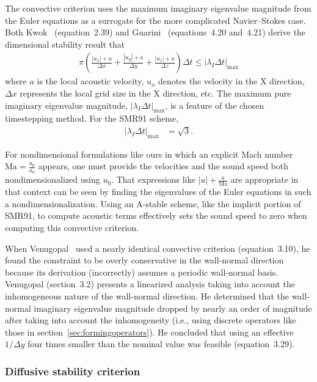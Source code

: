 \documentclass[letterpaper,11pt,nointlimits,reqno,draft]{amsart}
\begin{document}
The convective criterion uses the maximum imaginary eigenvalue magnitude from
the Euler equations as a surrogate for the more complicated Navier--Stokes
case.  Both Kwok~\cite{Kwok2002} (equation~2.39) and Guarini~\cite{Guarini1998}
(equations~4.20 and~4.21) derive the dimensional stability result that
\begin{align}\label{eq:convectivestability}
  \pi\left(
      \frac{\left|u_{x}\right| + a}{\Delta{}x}
    + \frac{\left|u_{y}\right| + a}{\Delta{}y}
    + \frac{\left|u_{z}\right| + a}{\Delta{}z}
  \right) \Delta{}t \leq \left|\lambda_{I}\Delta{}t\right|_{\mbox{max}}
\end{align}
where $a$ is the local acoustic velocity, $u_{x}$ denotes the velocity in the X
direction, $\Delta{}x$ represents the local grid size in the X direction, etc.
The maximum pure imaginary eigenvalue magnitude,
$\left|\lambda_{I}\Delta{}t\right|_{\mbox{max}}$, is a feature of the chosen
timestepping method.  For the SMR91 scheme,
\begin{align}
  \left|\lambda_{I}\Delta{}t\right|_{\mbox{max}} &= \sqrt{3}.
\end{align}

For nondimensional formulations like ours in which an explicit Mach number
$\mbox{Ma}=\frac{u_0}{a_0}$ appears, one must provide the velocities and the
sound speed both nondimensionalized using $u_0$.  That expressions like
$\left|u\right| + \frac{a}{\mbox{Ma}}$ are appropriate in that context can be
seen by finding the eigenvalues of the Euler equations in such a
nondimensionalization.  Using an A-stable scheme, like the implicit portion of
SMR91, to compute acoustic terms effectively sets the sound speed to zero when
computing this convective criterion.

When Venugopal~\cite{Venugopal2003} used a nearly identical convective
criterion (equation~3.10), he found the constraint to be overly conservative in
the wall-normal direction because its derivation (incorrectly) assumes a
periodic wall-normal basis.  Venugopal (section~3.2) presents a linearized
analysis taking into account the inhomogeneous nature of the wall-normal
direction.  He determined that the wall-normal imaginary eigenvalue magnitude
dropped by nearly an order of magnitude after taking into account the
inhomogeneity (i.e., using discrete operators like those in
section~\ref{sec:formingoperators}).  He concluded that using an effective
$1/\Delta{}y$ four times smaller than the nominal value was feasible
(equation~3.29).

\subsubsection{Diffusive stability criterion}
\label{sec:diffusivestability}
\end{document}
